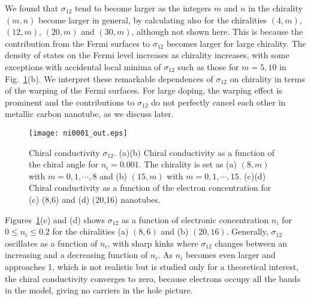 \documentclass[journal=nalefd,manuscript=article,layout=twocolumn]{achemso}
\begin{document}
We found
that $\sigma_{12}$ tend to become larger as the integers $m$ and $n$ in the chirality $(m,n)$ become larger in 
general, by calculating 
also for the chiralities $(4,m)$, $(12,m)$, $(20,m)$ and $(30,m)$, although not shown here. 
This is because the contribution from the Fermi surfaces to $\sigma_{12}$ becomes larger for large chirality. The density of states on the Fermi level increases as chirality increases, with some exceptions with accidental local minima of $\sigma_{12}$ such as those for 
$m=5,10$ in Fig.\ \ref{fg:815ni0001}(b). 
We interpret these remarkable dependences of $\sigma_{12}$ on chirality in terms of the warping of the Fermi surfaces. 
For large doping, the warping effect is prominent and the contributions to  $\sigma_{12}$ do not perfectly cancel each other in metallic carbon nanotube, as we discuss later. 
\begin{figure}[htb]
\texttt{[image: ni0001\_out.eps]}
\caption{Chiral conductivity $\sigma_{12}$. (a)(b) Chiral conductivity as a function of the chiral angle for $n_i=0.001$. 
The chirality is set as (a) $(8,m)$ with $m=0,1,\cdots,8$ and 
(b) $(15,m)$ with $m=0,1,\cdots,15$.  (c)(d) Chiral conductivity as a function of the electron concentration for (c) (8,6) and (d) (20,16) nanotubes.}
\label{fg:815ni0001}
\end{figure}
 
Figures\ \ref{fg:815ni0001}(c) and (d) shows $\sigma_{12}$ as a function of electronic concentration $n_i$ 
for $0\leq n_i\leq0.2$ for the chiralities (a) $(8,6)$ and (b) $(20,16)$. 
Generally, $\sigma_{12}$ oscillates as a function of $n_i$, with sharp kinks where 
$\sigma_{12}$ changes between an increasing and a decreasing function of $n_i$.  
As $n_i$ becomes even larger and approaches 1, which is not realistic but is studied only for a theoretical interest, the chiral conductivity converges to zero, because electrons 
occupy all the bands in the model, giving no carriers in the hole picture. 
\end{document}
